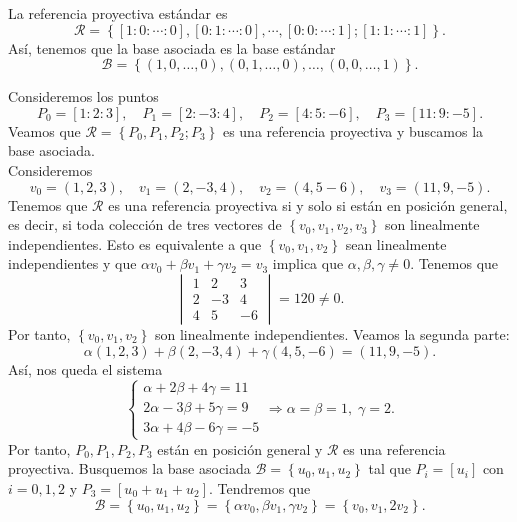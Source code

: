\begin{eg}
	La referencia proyectiva estándar es  
	\[ \mathcal{R} = \left\{ \left[1:0:\cdots:0\right] , [0:1:\cdots:0], \cdots , [0:0:\cdots :1]; [1:1: \cdots :1]\right\}.\]
Así, tenemos que la base asociada es la base estándar
\[\mathcal{B} = \left\{ \left(1,0, \ldots, 0\right), \left(0,1, \ldots, 0\right), \ldots, \left(0,0, \ldots, 1\right)\right\}  .\]
\end{eg}
\begin{eg}
Consideremos los puntos 
\[P_{0} = [1:2:3], \quad P_{1} = [2:-3:4], \quad P_{2} = [4:5:-6], \quad P_{3} = [11:9:-5] .\]
Veamos que $\displaystyle \mathcal{R} = \left\{ P_{0}, P_{1}, P_{2} ; P_{3}\right\}  $ es una referencia proyectiva y buscamos la base asociada. \\
Consideremos 
\[v_{0} = \left(1,2,3\right), \quad v_{1} = \left(2, -3, 4\right), \quad v_{2} = \left(4,5-6\right), \quad v_{3} = \left(11,9,-5\right) .\]
Tenemos que $\displaystyle \mathcal{R} $ es una referencia proyectiva si y solo si están en posición general, es decir, si toda colección de tres vectores de $\displaystyle \left\{ v_{0}, v_{1}, v_{2}, v_{3}\right\}  $ son linealmente independientes. Esto es equivalente a que $\displaystyle \left\{ v_{0}, v_{1}, v_{2}\right\}  $ sean linealmente independientes y que $\displaystyle \alpha v_{0} + \beta v_{1} + \gamma v_{2} = v_{3} $ implica que $\displaystyle \alpha, \beta, \gamma \neq 0 $. Tenemos que
\[\begin{vmatrix} 1 & 2 & 3 \\ 2 & -3 & 4 \\ 4 & 5 & -6 \end{vmatrix}  = 120 \neq 0 .\]
Por tanto, $\displaystyle \left\{ v_{0}, v_{1}, v_{2}\right\}  $ son linealmente independientes. Veamos la segunda parte:
\[\alpha\left(1,2,3\right) + \beta\left(2,-3,4\right) + \gamma\left(4,5,-6\right) = \left(11,9,-5\right) .\]
Así, nos queda el sistema 
\[
\begin{cases}
\alpha + 2\beta + 4\gamma = 11 \\
2\alpha - 3\beta + 5\gamma = 9 \\
3\alpha + 4\beta -6\gamma = -5
\end{cases}
\Rightarrow \alpha = \beta = 1, \; \gamma = 2.\]
Por tanto, $\displaystyle P_{0}, P_{1}, P_{2}, P_{3} $ están en posición general y $\displaystyle \mathcal{R} $ es una referencia proyectiva. Busquemos la base asociada $\displaystyle \mathcal{B}= \left\{ u_{0}, u_{1}, u_{2}\right\}  $ tal que $\displaystyle P_{i} = [u_{i}] $ con $\displaystyle i = 0, 1, 2 $ y $\displaystyle P_{3} = [u_{0} + u_{1} + u_{2}] $. Tendremos que 
\[\mathcal{B} = \left\{ u_{0}, u_{1}, u_{2}\right\} = \left\{ \alpha v_{0}, \beta v_{1}, \gamma v_{2}\right\} = \left\{ v_{0}, v_{1}, 2v_{2}\right\}  .\]
\end{eg}
